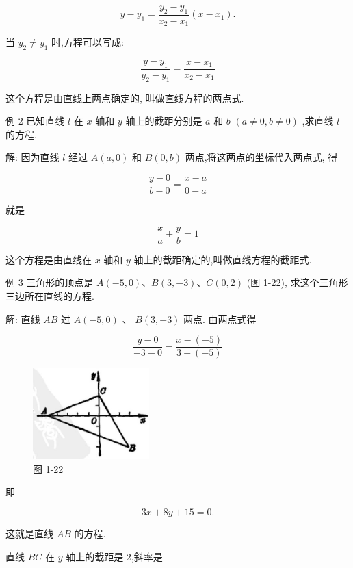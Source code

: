 \documentclass[lang=cn,newtx,10pt,scheme=chinese]{elegantbook}
\begin{document}
\[
  y - {y}_{1} = \frac{{y}_{2} - {y}_{1}}{{x}_{2} - {x}_{1}}\left( {x - {x}_{1}}\right) .
\]
\begin{corollary}[两点式]
当 \({y}_{2} \neq {y}_{1}\) 时,方程可以写成:

\[
  \frac{y - {y}_{1}}{{y}_{2} - {y}_{1}} = \frac{x - {x}_{1}}{{x}_{2} - {x}_{1}}
\]

这个方程是由直线上两点确定的, 叫做直线方程的两点式.
\end{corollary}
例 2 已知直线 \(l\) 在 \(x\) 轴和 \(y\) 轴上的截距分别是 \(a\) 和 \(b\) \(\left( {a \neq 0,b \neq 0}\right)\) ,求直线 \(l\) 的方程.

解: 因为直线 \(l\) 经过 \(A\left( {a,0}\right)\) 和 \(B\left( {0,b}\right)\) 两点,将这两点的坐标代入两点式, 得

\[
  \frac{y - 0}{b - 0} = \frac{x - a}{0 - a}
\]

就是
\begin{corollary}[截距式]
\[
  \frac{x}{a} + \frac{y}{b} = 1
\]

这个方程是由直线在 \(x\) 轴和 \(y\) 轴上的截距确定的,叫做直线方程的截距式.
\end{corollary}
例 3 三角形的顶点是 \(A\left( {-5,0}\right) \text{、}B\left( {3, - 3}\right) \text{、}C\left( {0,2}\right)\) (图 1-22), 求这个三角形三边所在直线的方程.

解: 直线 \({AB}\) 过 \(A\left( {-5,0}\right)\) 、 \(B\left( {3, - 3}\right)\) 两点. 由两点式得

\[
  \frac{y - 0}{-3 - 0} = \frac{x - \left( {-5}\right) }{3 - \left( {-5}\right) }
\]

\begin{figure}[h]
  \centering
  \includegraphics[max width=0.4\textwidth]{images/01912cc2-ffb6-728e-9ae7-b113ff05c64b_26_981074.jpg}
  \caption{图 1-22}
\end{figure}



即

\[
    {3x} + {8y} + {15} = 0.
\]

这就是直线 \({AB}\) 的方程.

直线 \({BC}\) 在 \(y\) 轴上的截距是 2,斜率是
\end{document}
